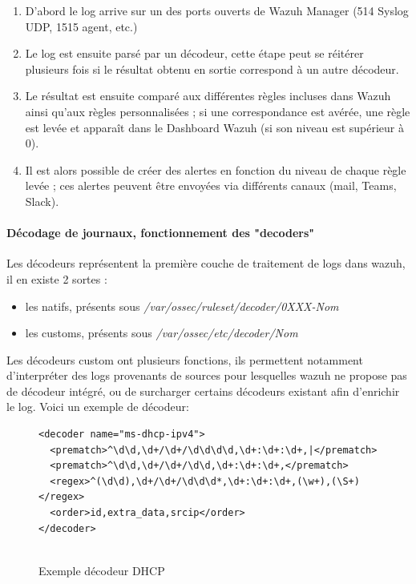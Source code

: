 \documentclass[a4paper, 11pt]{article}
\begin{document}
\begin{enumerate}
  \item[$\bullet$] D'abord le log arrive sur un des ports ouverts de Wazuh Manager (514 Syslog UDP, 1515 agent, etc.)
  \item[$\bullet$] Le log est ensuite parsé par un décodeur, cette étape peut se réitérer plusieurs fois si le résultat obtenu en sortie correspond à un autre décodeur.
  \item[$\bullet$] Le résultat est ensuite comparé aux différentes règles incluses dans Wazuh ainsi qu'aux règles personnalisées ; si une correspondance est avérée, une règle est levée et apparaît dans le Dashboard Wazuh (si son niveau est supérieur à 0).
  \item[$\bullet$] Il est alors possible de créer des alertes en fonction du niveau de chaque règle levée ; ces alertes peuvent être envoyées via différents canaux (mail, Teams, Slack).
  \end{enumerate}
  
\newpage
\paragraph{Décodage de journaux, fonctionnement des "decoders"}
Les décodeurs représentent la première couche de traitement de logs dans wazuh, il en existe 2 sortes : 
\par\bigskip

\begin{itemize}
    \item[$\bullet$] les natifs, présents sous \textit{/var/ossec/ruleset/decoder/0XXX-Nom}
    \item[$\bullet$] les customs, présents sous \textit{/var/ossec/etc/decoder/Nom}
\end{itemize}
\par\bigskip


Les décodeurs custom ont plusieurs fonctions, ils permettent notamment d'interpréter des logs provenants de sources
 pour lesquelles wazuh ne propose pas de décodeur intégré, ou de surcharger certains décodeurs existant afin d'enrichir
  le log. Voici un exemple de décodeur:


\begin{figure}[H]
  \centering
  \begin{minipage}{1\textwidth}
\begin{lstlisting}[language=WazuhXML]
<decoder name="ms-dhcp-ipv4">
  <prematch>^\d\d,\d+/\d+/\d\d\d\d,\d+:\d+:\d+,|</prematch>
  <prematch>^\d\d,\d+/\d+/\d\d,\d+:\d+:\d+,</prematch>
  <regex>^(\d\d),\d+/\d+/\d\d\d*,\d+:\d+:\d+,(\w+),(\S+)</regex>
  <order>id,extra_data,srcip</order>
</decoder>


\end{lstlisting}

  \caption{Exemple décodeur DHCP}
  \label{fig8}
  \end{minipage}
\end{figure}
\end{document}
